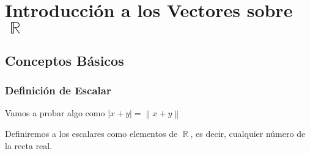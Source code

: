 \documentclass[12pt, fleqn]{report}                             %
\newcommand{\abs}[1]{\left\lvert #1 \right\lvert}               %
\newcommand{\Abs}[1]{\left\lVert #1 \right\lVert}               %
\DeclareMathOperator \Reals        {\mathbb{R}}                 %
\begin{document}
\restoregeometry                                                    %
\nopagecolor                                                        %






\tableofcontents{}
\label{sec:Index}

\clearpage



\part{Introducción a los Vectores sobre $\Reals$}


    \chapter{Conceptos Básicos}
    

        \clearpage
        \section{Definición de Escalar}


            Vamos a probar algo como $\abs{x+y} = \Abs{x+y}$
        
            Definiremos a los escalares como elementos de $\Reals$, es decir, cualquier número de
            la recta real.
\end{document}
